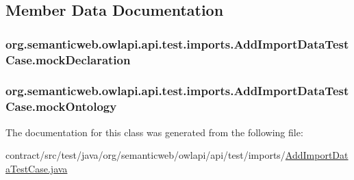\subsection{Member Data Documentation}
\hypertarget{classorg_1_1semanticweb_1_1owlapi_1_1api_1_1test_1_1imports_1_1_add_import_data_test_case_a9b8f31a96b8a4da2be99adaa521c3a3e}{
\subsubsection[{mock\-Declaration}]{ org.\-semanticweb.\-owlapi.\-api.\-test.\-imports.\-Add\-Import\-Data\-Test\-Case.\-mock\-Declaration\hspace{0.3cm}{\ttfamily [private]}}}\label{classorg_1_1semanticweb_1_1owlapi_1_1api_1_1test_1_1imports_1_1_add_import_data_test_case_a9b8f31a96b8a4da2be99adaa521c3a3e}
\hypertarget{classorg_1_1semanticweb_1_1owlapi_1_1api_1_1test_1_1imports_1_1_add_import_data_test_case_a292f7297c376c5b68ffef3e7b0aa03f2}{
\subsubsection[{mock\-Ontology}]{ org.\-semanticweb.\-owlapi.\-api.\-test.\-imports.\-Add\-Import\-Data\-Test\-Case.\-mock\-Ontology\hspace{0.3cm}{\ttfamily [private]}}}\label{classorg_1_1semanticweb_1_1owlapi_1_1api_1_1test_1_1imports_1_1_add_import_data_test_case_a292f7297c376c5b68ffef3e7b0aa03f2}


The documentation for this class was generated from the following file\-:\begin{DoxyCompactItemize}
\item 
contract/src/test/java/org/semanticweb/owlapi/api/test/imports/\hyperlink{_add_import_data_test_case_8java}{Add\-Import\-Data\-Test\-Case.\-java}\end{DoxyCompactItemize}
